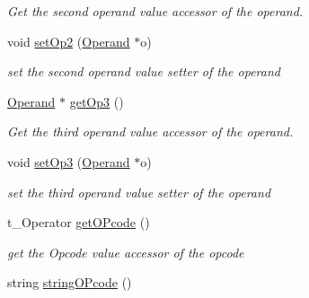 \begin{DoxyCompactItemize}
\begin{DoxyCompactList}\small\item\em Get the second operand value accessor of the operand. \item\end{DoxyCompactList}\item 
\hypertarget{classInstruction_a33a107262438a4f63730c82a1f30300e}{
void \hyperlink{classInstruction_a33a107262438a4f63730c82a1f30300e}{setOp2} (\hyperlink{classOperand}{Operand} $\ast$o)}
\label{classInstruction_a33a107262438a4f63730c82a1f30300e}

\begin{DoxyCompactList}\small\item\em set the second operand value setter of the operand \item\end{DoxyCompactList}\item 
\hypertarget{classInstruction_af871b07a0cc69f1c8bdcff9b7ee50ba3}{
\hyperlink{classOperand}{Operand} $\ast$ \hyperlink{classInstruction_af871b07a0cc69f1c8bdcff9b7ee50ba3}{getOp3} ()}
\label{classInstruction_af871b07a0cc69f1c8bdcff9b7ee50ba3}

\begin{DoxyCompactList}\small\item\em Get the third operand value accessor of the operand. \item\end{DoxyCompactList}\item 
\hypertarget{classInstruction_a29ee9d49576d6403fd81ce57967278ef}{
void \hyperlink{classInstruction_a29ee9d49576d6403fd81ce57967278ef}{setOp3} (\hyperlink{classOperand}{Operand} $\ast$o)}
\label{classInstruction_a29ee9d49576d6403fd81ce57967278ef}

\begin{DoxyCompactList}\small\item\em set the third operand value setter of the operand \item\end{DoxyCompactList}\item 
\hypertarget{classInstruction_a973185cd0d1e01d62115a8b1da956f9f}{
t\_\-Operator \hyperlink{classInstruction_a973185cd0d1e01d62115a8b1da956f9f}{getOPcode} ()}
\label{classInstruction_a973185cd0d1e01d62115a8b1da956f9f}

\begin{DoxyCompactList}\small\item\em get the Opcode value accessor of the opcode \item\end{DoxyCompactList}\item 
\hypertarget{classInstruction_af372e543adb180ce7c9433e3b0d3cd1f}{
string \hyperlink{classInstruction_af372e543adb180ce7c9433e3b0d3cd1f}{stringOPcode} ()}
\label{classInstruction_af372e543adb180ce7c9433e3b0d3cd1f}


\end{DoxyCompactItemize}
